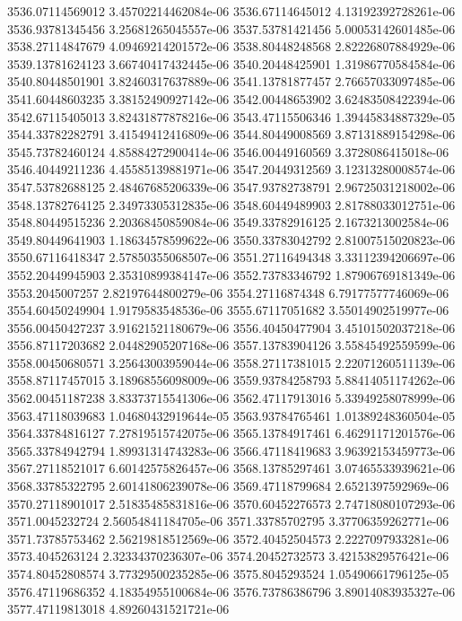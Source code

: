 {3536.07114569012 3.45702214462084e-06
3536.67114645012 4.13192392728261e-06
3536.93781345456 3.25681265045557e-06
3537.53781421456 5.00053142601485e-06
3538.27114847679 4.09469214201572e-06
3538.80448248568 2.82226807884929e-06
3539.13781624123 3.66740417432445e-06
3540.20448425901 1.31986770584584e-06
3540.80448501901 3.82460317637889e-06
3541.13781877457 2.76657033097485e-06
3541.60448603235 3.38152490927142e-06
3542.00448653902 3.62483508422394e-06
3542.67115405013 3.82431877878216e-06
3543.47115506346 1.39445834887329e-05
3544.33782282791 3.41549412416809e-06
3544.80449008569 3.87131889154298e-06
3545.73782460124 4.85884272900414e-06
3546.00449160569 3.3728086415018e-06
3546.40449211236 4.45585139881971e-06
3547.20449312569 3.12313280008574e-06
3547.53782688125 2.48467685206339e-06
3547.93782738791 2.96725031218002e-06
3548.13782764125 2.34973305312835e-06
3548.60449489903 2.81788033012751e-06
3548.80449515236 2.20368450859084e-06
3549.33782916125 2.1673213002584e-06
3549.80449641903 1.18634578599622e-06
3550.33783042792 2.81007515020823e-06
3550.67116418347 2.57850355068507e-06
3551.27116494348 3.33112394206697e-06
3552.20449945903 2.35310899384147e-06
3552.73783346792 1.87906769181349e-06
3553.2045007257 2.82197644800279e-06
3554.27116874348 6.79177577746069e-06
3554.60450249904 1.9179583548536e-06
3555.67117051682 3.55014902519977e-06
3556.00450427237 3.91621521180679e-06
3556.40450477904 3.45101502037218e-06
3556.87117203682 2.04482905207168e-06
3557.13783904126 3.55845492559599e-06
3558.00450680571 3.25643003959044e-06
3558.27117381015 2.22071260511139e-06
3558.87117457015 3.18968556098009e-06
3559.93784258793 5.88414051174262e-06
3562.00451187238 3.83373715541306e-06
3562.47117913016 5.33949258078999e-06
3563.47118039683 1.04680432919644e-05
3563.93784765461 1.01389248360504e-05
3564.33784816127 7.27819515742075e-06
3565.13784917461 6.46291171201576e-06
3565.33784942794 1.89931314743283e-06
3566.47118419683 3.96392153459773e-06
3567.27118521017 6.60142575826457e-06
3568.13785297461 3.07465533939621e-06
3568.33785322795 2.60141806239078e-06
3569.47118799684 2.6521397592969e-06
3570.27118901017 2.51835485831816e-06
3570.60452276573 2.74718080107293e-06
3571.0045232724 2.56054841184705e-06
3571.33785702795 3.37706359262771e-06
3571.73785753462 2.56219818512569e-06
3572.40452504573 2.2227097933281e-06
3573.4045263124 2.32334370236307e-06
3574.20452732573 3.42153829576421e-06
3574.80452808574 3.77329500235285e-06
3575.8045293524 1.05490661796125e-05
3576.47119686352 4.18354955100684e-06
3576.73786386796 3.89014083935327e-06
3577.47119813018 4.89260431521721e-06
}
